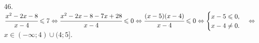 46. $\cfrac{x^2-2x-8}{x-4}\leqslant 7\Leftrightarrow \cfrac{x^2-2x-8-7x+28}{x-4}\leqslant0 \Leftrightarrow \cfrac{(x-5)(x-4)}{x-4}\leqslant0
\Leftrightarrow \begin{cases}x-5\leqslant 0,\\ x-4\neq0.\end{cases}\Leftrightarrow$\\$ x\in (-\infty;4)\cup(4;5].$\\
